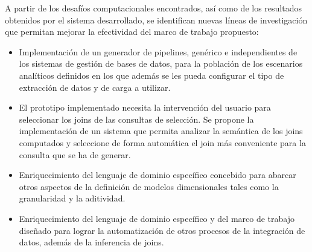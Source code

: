 \begin{recomendations}
A partir de los desafíos computacionales encontrados, así como de los resultados
obtenidos por el sistema desarrollado, se identifican nuevas líneas de investigación que
permitan mejorar la efectividad del marco de trabajo propuesto:

\begin{itemize}
    \item Implementaci\'on de un generador de pipelines, gen\'erico e independientes de los sistemas 
        de gestión de bases de datos, para la poblaci\'on de los escenarios analíticos definidos en los 
        que adem\'as se les pueda configurar el tipo de extracción de datos y de carga a utilizar.
        
    \item El prototipo implementado necesita la intervención del usuario para seleccionar los joins
        de las consultas de selecci\'on. Se propone la implementaci\'on de un sistema que permita 
        analizar la semántica de los joins computados y seleccione de forma autom\'atica el join 
        m\'as conveniente para la consulta que se ha de generar.

    \item Enriquecimiento del lenguaje de dominio espec\'ifico concebido para abarcar otros aspectos 
        de la definición de modelos dimensionales tales como la granularidad y la aditividad. 
        
    \item Enriquecimiento del lenguaje de dominio espec\'ifico y del marco de trabajo diseñado 
        para lograr la automatizaci\'on de otros procesos de la integraci\'on de datos, además de la inferencia 
        de joins.
\end{itemize}

\end{recomendations}
